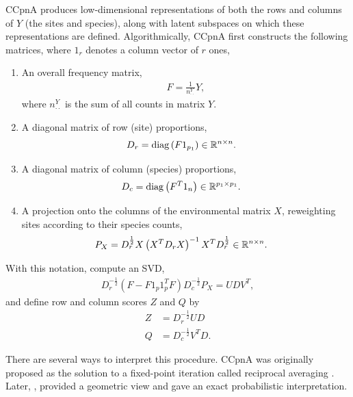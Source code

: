 \documentclass{article}
\begin{document}
CCpnA produces low-dimensional representations of both the rows and columns of
$Y$ (the sites and species), along with latent subspaces on which these
representations are defined. Algorithmically, CCpnA first constructs the
following matrices, where $1_{r}$ denotes a column vector of $r$ ones,
\begin{enumerate}
  \item An overall frequency matrix,
    \begin{align*}
      F = \frac{1}{n_{\cdot\cdot}^{Y}} Y,
  \end{align*}
  where $n_{\cdot\cdot}^{Y}$ is the sum of all counts in matrix
  $Y$.
\item A diagonal matrix of row (site) proportions,
  \begin{align*}
    D_{r} &= \mathop\mathrm{diag}\left(F 1_{p_{1}}\right) \in \mathbb{R}^{n \times n}.
  \end{align*}
\item A diagonal matrix of column (species) proportions,
  \begin{align*}
    D_{c} &= \mathop\mathrm{diag}\left(F^{T}1_{n}\right) \in \mathbb{R}^{p_{1} \times p_{1}}.
  \end{align*}
\item A projection onto the columns of the environmental matrix
  $X$, reweighting sites according to their species counts,
  \begin{align*}
    P_{X} &= D_{r}^{\frac{1}{2}}X\left(X^{T}D_{r}X\right)^{-1}X^{T}D_{r}^{\frac{1}{2}} \in
  \mathbb{R}^{n \times n}.
\end{align*}
\end{enumerate}

With this notation, compute an SVD,
\begin{align*}
D_{r}^{-\frac{1}{2}}\left(F - F 1_{p}1_{p}^{T}F\right)D_{c}^{-\frac{1}{2}}P_{X}
= UDV^{T},
\end{align*}
and define row and column scores $Z$ and $Q$ by
\begin{align*}
  Z &= D_{r}^{-\frac{1}{2}} UD \\
  Q &= D_{c}^{-\frac{1}{2}}V^{T}D.
\end{align*}

There are several ways to interpret this procedure. CCpnA was originally
proposed as the solution to a fixed-point iteration called reciprocal averaging
\citep{ter1986canonical}. Later, \cite{greenacre1987geometric,
  greenacre1984theory}, provided a geometric view and \cite{zhu2005constrained}
gave an exact probabilistic interpretation.
\end{document}
